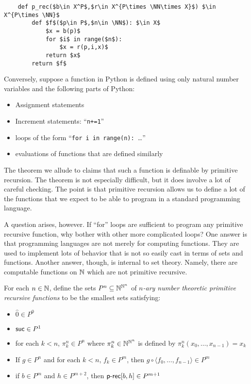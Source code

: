 \begin{lstlisting}
	def p_rec($b\in X^P$,$r\in X^{P\times \NN\times X}$) $\in X^{P\times \NN}$
		def $f$($p\in P$,$n\in \NN$): $\in X$
			$x = b(p)$
			for $i$ in range($n$):
				$x = r(p,i,x)$
			return $x$
		return $f$
\end{lstlisting}

Conversely, suppose a function in Python is defined using only natural number variables and the following parts of Python:
\begin{itemize}
	\item Assignment statements
	\item Increment statements: ``\lstinline!n+=1!''
	\item loops of the form ``\lstinline!for i in range(n): !\ldots''
	\item evaluations of functions that are defined similarly
\end{itemize}
The theorem we allude to claims that such a function is definable by primitive recursion. The theorem is not especially difficult, but it does involve a lot of careful checking. The point is that primitive recursion allows us to define a lot of the functions that we expect to be able to program in a standard programming language.

A question arises, however. If ``for'' loops are sufficient to program any primitive recursive function, why bother with other more complicated loops?
One answer is that programming languages are not merely for computing functions. They are used to implement lots of behavior that is not so easily cast in terms of sets and functions. Another answer, though, is internal to set theory. Namely, there are computable functions on $\mathbb N$ which are not primitive recursive.

For each $n\in \mathbb N$, define the sets $P^n\subseteq \mathbb N^{\mathbb N^n}$ of \emph{$n$-ary number theoretic primitive recursive functions} to be the smallest sets satisfying:
\begin{itemize}
	\item $\hat{0} \in P^0$
	\item $\mathord{\textsf{suc}}\in P^1$
	\item for each $k<n$, $\pi^n_k\in P^n$ where $\pi^n_k\in \mathbb N^{\mathbb N^n}$ is defined by $\pi^n_k(x_0,\dotsc, x_{n-1}) = x_k$
	\item If $g\in P^n$ and for each $k<n$, $f_k\in P^m$, then $g\circ \langle f_0,\dotsc, f_{n-1}\rangle \in P^m$
	\item if $b\in P^m$ and $h\in P^{m+2}$, then $\mathord{\textsf{p-rec}}[b,h]\in P^{m+1}$
\end{itemize}

